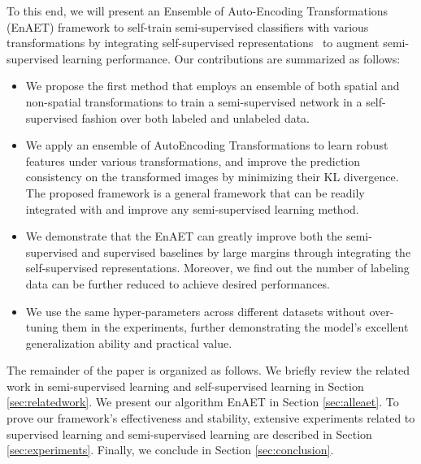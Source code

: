 \documentclass[journal]{IEEEtran}
\begin{document}
To this end, we will present an Ensemble of Auto-Encoding Transformations (EnAET) framework to self-train semi-supervised classifiers with various transformations by integrating self-supervised representations~\cite{zhang2019aet} to augment semi-supervised learning performance.  Our contributions are summarized as follows:
\begin{itemize}
    \item We propose the first method that employs an ensemble of both spatial and non-spatial transformations  to train a semi-supervised network in a self-supervised fashion over both labeled and unlabeled data.

    \item We apply an ensemble of AutoEncoding Transformations to learn robust features under various transformations, and improve the prediction consistency on the transformed images by minimizing their KL divergence. The proposed framework is a general framework that can be readily integrated with and improve any semi-supervised learning method.

    \item We demonstrate that the EnAET can greatly improve both the semi-supervised and supervised baselines by large margins through  integrating the self-supervised representations. Moreover, we find out the number of labeling data can be further reduced to achieve desired performances. 

    \item We use the same hyper-parameters across different datasets without over-tuning them in the experiments, further demonstrating the model's excellent generalization ability and practical value.
\end{itemize}
\par The remainder of the paper is organized as follows. We briefly review the related work in semi-supervised learning and self-supervised learning in Section \ref{sec:relatedwork}. We present our algorithm EnAET in Section \ref{sec:alleaet}.  To prove our framework's effectiveness and stability, extensive experiments related to supervised learning and semi-supervised learning are described in Section \ref{sec:experiments}. Finally, we conclude in Section \ref{sec:conclusion}.
\end{document}
